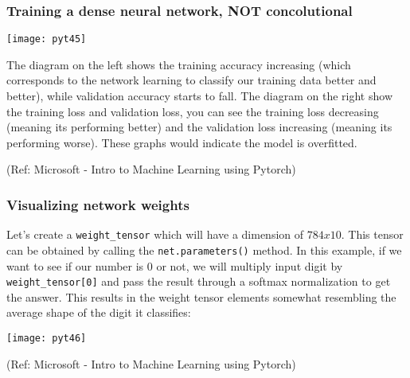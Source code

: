 \begin{frame}[fragile] \frametitle{Training a dense neural network, NOT concolutional}

\begin{center}
\texttt{[image: pyt45]}
\end{center}

The diagram on the left shows the training accuracy increasing (which corresponds to the network learning to classify our training data better and better), while validation accuracy starts to fall. The diagram on the right show the training loss and validation loss, you can see the training loss decreasing (meaning its performing better) and the validation loss increasing (meaning its performing worse). These graphs would indicate the model is overfitted.

\tiny{(Ref: Microsoft - Intro to Machine Learning using Pytorch)}
\end{frame}

\begin{frame}[fragile] \frametitle{Visualizing network weights}

Let's create a \lstinline|weight_tensor| which will have a dimension of $784x10$. This tensor can be obtained by calling the \lstinline|net.parameters()| method. In this example, if we want to see if our number is 0 or not, we will multiply input digit by \lstinline|weight_tensor[0]| and pass the result through a softmax normalization to get the answer. This results in the weight tensor elements somewhat resembling the average shape of the digit it classifies:


\begin{center}
\texttt{[image: pyt46]}
\end{center}


\tiny{(Ref: Microsoft - Intro to Machine Learning using Pytorch)}
\end{frame}




